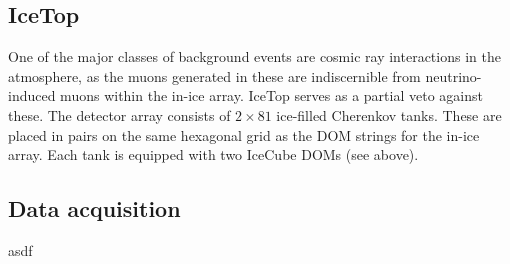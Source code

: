\documentclass[
    a4paper, %
    fontsize=10pt, %
    twoside=true, %
    numbers=noenddot, %
    fontmethod=tex, %
]{kaobook}
\begin{document}
\subsection*{IceTop}
One of the major classes of background events are cosmic ray interactions in the atmosphere, as the muons generated in these are indiscernible from neutrino-induced muons within the in-ice array. IceTop serves as a partial veto against these. The detector array consists of $2\times81$ ice-filled Cherenkov tanks. These are placed in pairs on the same hexagonal grid as the DOM strings for the in-ice array. Each tank is equipped with two IceCube DOMs (see  above).

\subsection*{Data acquisition}
asdf
%



\appendix




\backmatter %


\printbibliography[heading=bibintoc, title=Bibliography] %
\end{document}
